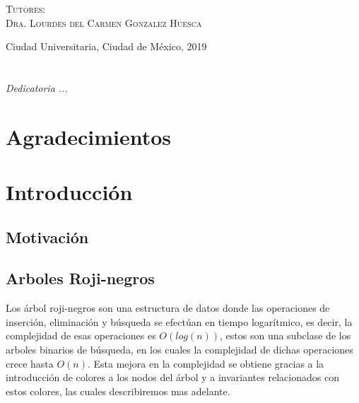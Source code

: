 \documentclass[letterpaper,12pt,oneside]{book}
\newcommand{\arn}{árbol roji-negro}
\theoremstyle{plain}
\theoremstyle{definition}
\theoremstyle{remark}
\begin{document}
\begin{titlepage}
\begin{minipage}[c][0.81\textheight][t]{0.75\textwidth}
\begin{center}
\vspace{0.5cm}

{\large\scshape Tutores:\\[0.3cm] {Dra. Lourdes del Carmen Gonzalez Huesca}}\\[.2in]

\vspace{0.5cm}

\large{Ciudad Universitaria, Ciudad de México,}{ }{2019}
\end{center}
\end{minipage}
\end{titlepage}



\frontmatter
\chapter*{}
\begin{flushright}%
\emph{Dedicatoria ...}
\thispagestyle{empty}
\end{flushright}

\chapter{Agradecimientos}

\tableofcontents
\listoffigures


\mainmatter

\chapter{Introducción} 
\section{Motivación}
\section{Arboles Roji-negros}
Los {{{{\arn}}}s} son una estructura de datos donde las operaciones de inserci\'on, eliminaci\'on y búsqueda se efectúan
en tiempo logarítmico, es decir, la complejidad de esas operaciones es $O(log(n))$, estos son una subclase de los
arboles binarios de búsqueda, en los cuales la complejidad de dichas operaciones crece hasta $O(n)$. Esta mejora en la complejidad se obtiene 
gracias a la introducción de colores a los nodos del \'arbol y a invariantes relacionados con estos colores, las cuales describiremos 
mas adelante.
\end{document}
